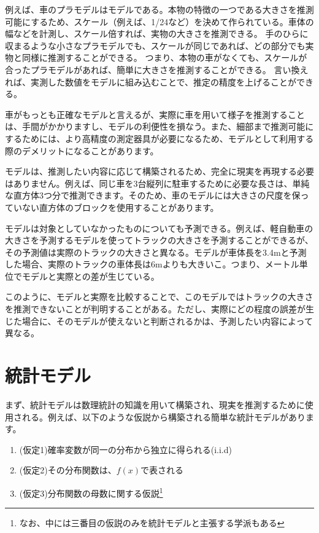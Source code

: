 例えば、車のプラモデルはモデルである。本物の特徴の一つである大きさを推測可能にするため、スケール（例えば、1/24など）を決めて作られている。車体の幅などを計測し、スケール倍すれば、実物の大きさを推測できる。
手のひらに収まるような小さなプラモデルでも、スケールが同じであれば、どの部分でも実物と同様に推測することができる。
つまり、本物の車がなくても、スケールが合ったプラモデルがあれば、簡単に大きさを推測することができる。
言い換えれば、実測した数値をモデルに組み込むことで、推定の精度を上げることができる。

車がもっとも正確なモデルと言えるが、実際に車を用いて様子を推測することは、手間がかかりますし、モデルの利便性を損なう。また、細部まで推測可能にするためには、より高精度の測定器具が必要になるため、モデルとして利用する際のデメリットになることがあります。

モデルは、推測したい内容に応じて構築されるため、完全に現実を再現する必要はありません。例えば、同じ車を3台縦列に駐車するために必要な長さは、単純な直方体3つ分で推測できます。そのため、車のモデルには大きさの尺度を保っていない直方体のブロックを使用することがあります。

モデルは対象としていなかったものについても予測できる。例えば、軽自動車の大きさを予測するモデルを使ってトラックの大きさを予測することができるが、その予測値は実際のトラックの大きさと異なる。モデルが車体長を3.4mと予測した場合、実際のトラックの車体長は6mよりも大きいこ。つまり、メートル単位でモデルと実際との差が生じている。

このように、モデルと実際を比較することで、このモデルではトラックの大きさを推測できないことが判明することがある。ただし、実際にどの程度の誤差が生じた場合に、そのモデルが使えないと判断されるかは、予測したい内容によって異なる。


\section{統計モデル}
まず、統計モデルは数理統計の知識を用いて構築され、現実を推測するために使用される。例えば、以下のような仮説から構築される簡単な統計モデルがあります。

\begin{enumerate}
 \item (仮定1)確率変数が同一の分布から独立に得られる(i.i.d)
 \item (仮定2)その分布関数は、$f(x)$で表される
 \item (仮定3)分布関数の母数に関する仮説\footnote{なお、中には三番目の仮説のみを統計モデルと主張する学派もある\cite{塩見_正衛2021}}
\end{enumerate}

